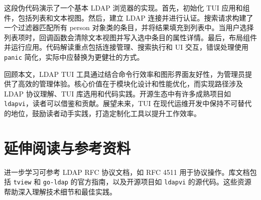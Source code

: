 这段伪代码演示了一个基本 LDAP 浏览器的实现。首先，初始化 TUI 应用和组件，包括列表和文本视图。然后，建立 LDAP 连接并进行认证。搜索请求构建了一个过滤器匹配所有 person 对象类的条目，并将结果填充到列表中。当用户选择列表项时，回调函数会清除文本视图并写入选中条目的属性详情。最后，布局组件并运行应用。代码解读重点包括连接管理、搜索执行和 UI 交互，错误处理使用 \texttt{panic} 简化，实际中应替换为更健壮的方式。\par
回顾本文，LDAP TUI 工具通过结合命令行效率和图形界面友好性，为管理员提供了高效的管理体验。核心价值在于模块化设计和性能优化，而实现路径涉及 LDAP 协议理解、TUI 库选用和代码实践。开源生态中有许多成熟项目如 \texttt{ldapvi}，读者可以借鉴和贡献。展望未来，TUI 在现代运维开发中保持不可替代的地位，鼓励读者动手实践，打造定制化工具以提升工作效率。\par
\chapter{延伸阅读与参考资料}
进一步学习可参考 LDAP RFC 协议文档，如 RFC 4511 用于协议操作。库文档包括 \texttt{tview} 和 \texttt{go-ldap} 的官方指南，以及开源项目如 \texttt{ldapvi} 的源代码。这些资源帮助深入理解技术细节和最佳实践。\par
